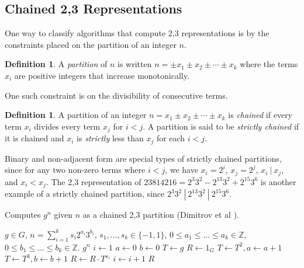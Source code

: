 \documentclass{ucalgthes1}
\theoremstyle{definition}
\newtheorem{defn}[thm]{Definition}
\newcommand{\ZZ}{\mathbb{Z}}
\begin{document}
\subsection{Chained 2,3 Representations}
\label{subsec:dbnsChains}

One way to classify algorithms that compute 2,3 representations is by the constraints placed on the partition of an integer $n$.

\begin{defn} \cite[\S 1]{Imbert2010}
A \emph{partition} of $n$ is written $n = \pm x_1 \pm x_2 \pm \cdots \pm x_k$ where the terms $x_i$ are positive integers that increase monotonically.
\end{defn}

\noindent
One such constraint is on the divisibility of consecutive terms.

\begin{defn}
\label{defn:chained} \cite[\S 1]{Imbert2010}
A partition of an integer $n = x_1 \pm x_2 \pm \cdots \pm x_k$ is \emph{chained} if every term $x_i$ divides every term $x_j$ for $i < j$. A partition is said to be \emph{strictly chained} if it is chained and $x_i$ is \emph{strictly} less than $x_j$ for each $i < j$.
\end{defn}

\noindent
Binary and non-adjacent form are special types of strictly chained partitions, since for any two non-zero terms where $i < j$, we have $x_i = 2^i$, $x_j = 2^j$, $ x_i ~|~ x_j$, and $x_i < x_j$.  The 2,3 representation of $23814216 = 2^3 3^2 - 2^{13} 3^2 + 2^{15} 3^6$ is another example of a strictly chained partition, since $2^3 3^2 ~|~ 2^{13} 3^2 ~|~ 2^{15} 3^6$.

\begin{algorithm}[htb]
\caption{Computes $g^n$ given $n$ as a chained 2,3 partition (Dimitrov et al \cite{Dimitrov2005}).}
\label{alg:expWithChain}
\begin{algorithmic}[1]
\Require $g \in G$, $n = \sum_{i=1}^k s_i2^{a_i}3^{b_i}$, $s_1,...,s_k \in \{-1, 1\}$, $0 \le a_1 \le ...\le a_k \in \ZZ$, $0 \le b_1 \le ... \le b_k \in \ZZ$.
\Ensure $g^n$
\State $i \gets 1$
\State $a \gets 0$ 
\State $b \gets 0$ 
\State $T \gets g$ 
\State $R \gets 1_G$
		\State $T \gets T^2, a \gets a + 1$
	\EndWhile
		\State $T \gets T^3, b \gets b + 1$
	\EndWhile
	\State $R \gets R \cdot T^{s_i}$ 
	\State $i \gets i + 1$
\EndWhile
\State \Return $R$
\end{algorithmic}
\end{algorithm}
\end{document}
